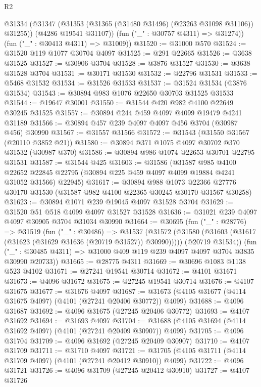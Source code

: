 \begin{lexlean}{R2}
\begin{coremodule}
        @31334
          (@31347 (@31353 (@31365 (@31480 @31496) (@23263 @31098 @31106)) @31255))
          (@4286 @19541 @31107))
        (fun ("_" : @30757 @4311) => @31274))
      (fun ("_" : @30413 @4311) => @31009))
@31520 := @31000 @570
@31524 := @31520 @119 @1077 @30704 @4097
@31525 := @291 @22665
@31526 := @3638 @31525
@31527 := @30906 @3704
@31528 := @3876 @31527
@31530 := @3638 @31528 @3704
@31531 := @30171 @31530
@31532 := @22796 @31531
@31533 := @5468 @31532
@31534 := @31526 @31533
@31537 := @31524 @31534 (@3876 @31534)
@31543 := @30894 @983 @1076 @22650 @30703 @31525 @31533
@31544 := @19647 @30001
@31550 := @31544 @420 @982 @4100 @22649 @30245 @31525
@31557 := @30894 @244 @459 @4097 @4099 @19479 @4241 @31189
@31566 := @30894 @457 @239 @4097 @4097 @456 @3704 (@30987 @456) @30990
@31567 := @31557 @31566
@31572 := @31543 (@31550 @31567 (@20110 @3852 @21))
@31580 := @30894 @371 @1075 @4097 @30702 @370 @31532 (@30987 @370)
@31586 := @30894 @986 @1074 @22653 @30701 @22795 @31531
@31587 := @31544 @425
@31603 := @31586
    (@31587
      @985
      @4100
      @22652
      @22845
      @22795
      (@30894 @225 @459 @4097 @4099 @19884 @4241 @31052 @31566)
      @22945)
@31617 := @30894
    @988
    @1073
    @22366
    @27776
    @30170
    @31530
    (@31587 @982 @4100 @22365 @30245 @30170 @31567 @30258)
@31623 := @30894 @1071 @239 @19045 @4097 @31528 @3704
@31629 := @31520 @51 @518 @4099 @4097 @31527 @31528
@31636 := @31021 @239 @4097 @4097 @30905 @3704 @31034 @30990
@31664 := @30695
    (fun ("_" : @28776) =>
    @31519
      (fun ("_" : @30486) =>
      @31537
        (@31572 (@31580 (@31603 (@31617 (@31623 (@31629 @31636 (@20719 @31527)) @30990)))))
        (@20719 @31534))
      (fun ("_" : @30485 @4311) => @31000 @409 @119 @239 @4097 @4097 @3704 @3835 @30990 @20733))
@31665 := @28775 @4311
@31669 := @30696 @1083 @1138 @523 @4102
@31671 := @27241 @19541 @30714
@31672 := @4101 @31671
@31673 := @4096 @31672
@31675 := @27245 @19541 @30714
@31676 := @4107 @31675
@31677 := @31676 @4097
@31687 := @31673 (@4105 @31677 (@4114 @31675 @4097) (@4101 (@27241 @20406 @30772)) @4099)
@31688 := @4096 @31687
@31692 := @4096 @31675 (@27245 @20406 @30772)
@31693 := @4107 @31692
@31694 := @31693 @4097
@31704 := @31688 (@4105 @31694 (@4114 @31692 @4097) (@4101 (@27241 @20409 @30907)) @4099)
@31705 := @4096 @31704
@31709 := @4096 @31692 (@27245 @20409 @30907)
@31710 := @4107 @31709
@31711 := @31710 @4097
@31721 := @31705 (@4105 @31711 (@4114 @31709 @4097) (@4101 (@27241 @20412 @30910)) @4099)
@31722 := @4096 @31721
@31726 := @4096 @31709 (@27245 @20412 @30910)
@31727 := @4107 @31726

\end{coremodule}
\end{lexlean}
